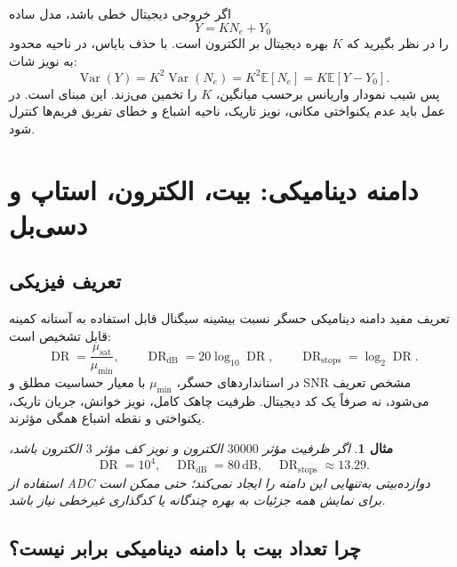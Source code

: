 \documentclass[12pt,openany,oneside]{book}
\newtheorem{example}{مثال}[chapter]
\newcommand{\E}{\mathbb{E}}
\newcommand{\Var}{\operatorname{Var}}
\begin{document}
اگر خروجی دیجیتال خطی باشد، مدل ساده
\begin{equation}
Y=K N_e+Y_0
\end{equation}
را در نظر بگیرید که \(K\) بهره دیجیتال بر الکترون است. با حذف بایاس، در ناحیه محدود به نویز شات:
\begin{equation}
\Var(Y)=K^2\Var(N_e)=K^2\E[N_e]=K\E[Y-Y_0].
\end{equation}
پس شیب نمودار واریانس برحسب میانگین، \(K\) را تخمین می‌زند. این مبنای 
است. در عمل باید عدم یکنواختی مکانی، نویز تاریک، ناحیه اشباع و خطای تفریق فریم‌ها کنترل شود.

\section{دامنه دینامیکی: بیت، الکترون، استاپ و دسی‌بل}

\subsection{تعریف فیزیکی}

تعریف مفید دامنه دینامیکی حسگر نسبت بیشینه سیگنال قابل استفاده به آستانه کمینه قابل تشخیص است:
\begin{equation}
\operatorname{DR}=\frac{\mu_{\mathrm{sat}}}{\mu_{\min}},
\qquad
\operatorname{DR}_{\mathrm{dB}}=20\log_{10}\operatorname{DR},
\qquad
\operatorname{DR}_{\mathrm{stops}}=\log_2\operatorname{DR}.
\label{eq:dynamic-range}
\end{equation}
در استانداردهای حسگر، \(\mu_{\min}\) با معیار حساسیت مطلق و SNR مشخص تعریف می‌شود، نه صرفاً
یک کد دیجیتال. ظرفیت چاهک کامل، نویز خوانش، جریان تاریک، یکنواختی و نقطه اشباع همگی مؤثرند.

\begin{example}
اگر ظرفیت مؤثر \(30000\) الکترون و نویز کف مؤثر \(3\) الکترون باشد،
\begin{equation}
\operatorname{DR}=10^4,
\quad \operatorname{DR}_{\mathrm{dB}}=80\,\mathrm{dB},
\quad \operatorname{DR}_{\mathrm{stops}}\approx13.29.
\end{equation}
استفاده از ADC دوازده‌بیتی به‌تنهایی این دامنه را ایجاد نمی‌کند؛ حتی ممکن است برای نمایش همه
جزئیات به بهره چندگانه یا کدگذاری غیرخطی نیاز باشد.
\end{example}

\subsection{چرا تعداد بیت با دامنه دینامیکی برابر نیست؟}
\end{document}
